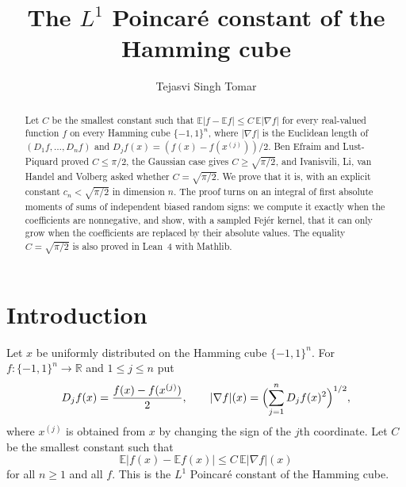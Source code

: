 \documentclass[11pt]{amsart}
\theoremstyle{remark}
\numberwithin{equation}{section}
\newcommand{\R}{\mathbb{R}}
\newcommand{\E}{\mathbb{E}}
\begin{document}
\title{The $L^1$ Poincar\'e constant of the Hamming cube}
\author{Tejasvi Singh Tomar}
\renewcommand{\urladdrname}{{\itshape ORCID}}

\begin{abstract}
Let $C$ be the smallest constant such that $\E|f-\E f|\le C\,\E|\nabla f|$ for every real-valued function $f$ on every Hamming cube $\{-1,1\}^n$, where $|\nabla f|$ is the Euclidean length of $(D_1f,\dots,D_nf)$ and $D_jf(x)=(f(x)-f(x^{(j)}))/2$. Ben Efraim and Lust-Piquard proved $C\le\pi/2$, the Gaussian case gives $C\ge\sqrt{\pi/2}$, and Ivanisvili, Li, van Handel and Volberg asked whether $C=\sqrt{\pi/2}$. We prove that it is, with an explicit constant $c_n<\sqrt{\pi/2}$ in dimension $n$. The proof turns on an integral of first absolute moments of sums of independent biased random signs: we compute it exactly when the coefficients are nonnegative, and show, with a sampled Fej\'er kernel, that it can only grow when the coefficients are replaced by their absolute values. The equality $C=\sqrt{\pi/2}$ is also proved in Lean~4 with Mathlib.
\end{abstract}

\maketitle

\section{Introduction}\label{sec:intro}

Let $x$ be uniformly distributed on the Hamming cube $\{-1,1\}^n$. For $f\colon\{-1,1\}^n\to\R$ and $1\le j\le n$ put
\[
D_jf(x)=\frac{f(x)-f(x^{(j)})}{2},\qquad |\nabla f|(x)=\Bigl(\sum_{j=1}^nD_jf(x)^2\Bigr)^{1/2},
\]
where $x^{(j)}$ is obtained from $x$ by changing the sign of the $j$th coordinate. Let $C$ be the smallest constant such that
\begin{equation}\label{eq:poincare}
\E\bigl|f(x)-\E f(x)\bigr|\le C\,\E|\nabla f|(x)
\end{equation}
for all $n\ge1$ and all $f$. This is the $L^1$ Poincar\'e constant of the Hamming cube.
\end{document}
